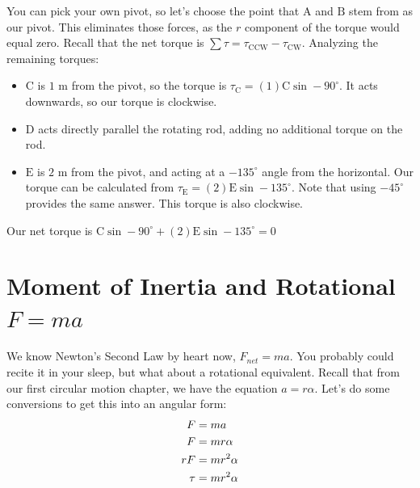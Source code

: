 \begin{Answer}[ref=opptorque2]
You can pick your own pivot, so let's choose the point that $\text{A}$ and $\text{B}$ stem from as our pivot. This eliminates those forces, as the $r$ component of the torque would equal zero. Recall that the net torque is $\sum \tau = \tau_\text{CCW} - \tau_\text{CW}$. Analyzing the remaining torques:
\begin{itemize}
  \item $\text{C}$ is $1 \text{ m}$ from the pivot, so the torque is $\tau_\text{C} = (1)\text{C}\sin-90^\circ$. It acts downwards, so our torque is clockwise.
  \item $\text{D}$ acts directly parallel the rotating rod, adding no additional torque on the rod.
  \item $\text{E}$ is $2 \text{ m}$ from the pivot, and acting at a $-135^\circ$ angle from the horizontal. Our torque can be calculated from $\tau_\text{E} = (2)\text{E}\sin-135^\circ$. Note that using $-45^\circ$ provides the same answer. This torque is also clockwise.
\end{itemize}

Our net torque is $\text{C}\sin-90^\circ + (2)\text{E}\sin-135^\circ = 0$

\end{Answer}

\section{Moment of Inertia and Rotational $F=ma$}
We know Newton's Second Law by heart now, $F_{net} = ma$. You probably could recite it in your sleep, but what about a rotational equivalent. Recall that from our first circular motion chapter, we have the equation $a = r \alpha$. Let's do some conversions to get this into an angular form:
\begin{align}
    F &= ma \notag \\
    F &= mr\alpha \notag \\
    rF &= mr^2\alpha \notag \\
    \tau &= mr^2\alpha \label{eq:rotNewt2ndLaw}
\end{align}

